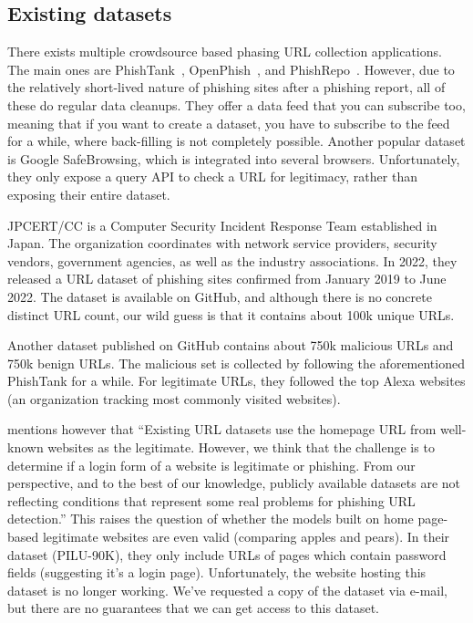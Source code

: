 \documentclass{article}
\begin{document}
    \subsection{Existing datasets}\label{subsec:datasets}

    There exists multiple crowdsource based phasing URL collection applications.
    The main ones are PhishTank~\cite{PhishTank}, OpenPhish~\cite{OpenPhish}, and PhishRepo~\cite{PhishRepo}.
    However, due to the relatively short-lived nature of phishing sites after a phishing report, all of these do regular data cleanups.
    They offer a data feed that you can subscribe too, meaning that if you want to create a dataset, you have to subscribe to the feed for a while, where back-filling is not completely possible.
    Another popular dataset is Google SafeBrowsing\cite{GoogleSafeBrowsing}, which is integrated into several browsers.
    Unfortunately, they only expose a query API to check a URL for legitimacy, rather than exposing their entire dataset.

    JPCERT/CC is a Computer Security Incident Response Team established in Japan.
    The organization coordinates with network service providers, security vendors, government agencies, as well as the industry associations\cite{JPCertCC}.
    In 2022, they released a URL dataset of phishing sites confirmed from January 2019 to June 2022\cite{JPCertCCDataset}.
    The dataset is available on GitHub, and although there is no concrete distinct URL count, our wild guess is that it contains about 100k unique URLs.

    Another dataset published on GitHub contains about 750k malicious URLs and 750k benign URLs\cite{VisualizingRNNInURLDetection}.
    The malicious set is collected by following the aforementioned PhishTank for a while.
    For legitimate URLs, they followed the top Alexa websites (an organization tracking most commonly visited websites).

    \cite{PhishingLoginURLDetection} mentions however that ``Existing URL datasets use the homepage URL from well-known websites as the legitimate.
    However, we think that the challenge is to determine if a login form of a website is legitimate or phishing.
    From our perspective, and to the best of our knowledge, publicly available datasets are not reflecting conditions that represent some real problems for phishing URL detection.''
    This raises the question of whether the models built on home page-based legitimate websites are even valid (comparing apples and pears).
    In their dataset (PILU-90K), they only include URLs of pages which contain password fields (suggesting it's a login page).
    Unfortunately, the website hosting this dataset is no longer working.
    We've requested a copy of the dataset via e-mail, but there are no guarantees that we can get access to this dataset.
\end{document}
